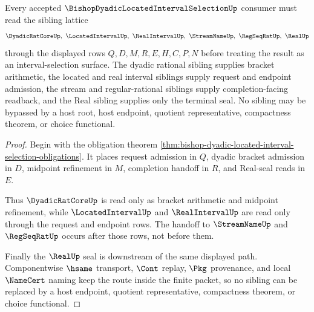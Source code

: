 \begin{theorem}
\label{thm:bishop-dyadic-located-interval-selection-sibling-lattice}
Every accepted $\BishopDyadicLocatedIntervalSelectionUp$ consumer must read the sibling lattice
$$
\DyadicRatCoreUp,\ \LocatedIntervalUp,\ \RealIntervalUp,\ \StreamNameUp,\ \RegSeqRatUp,\ \RealUp
$$
through the displayed rows $Q,D,M,R,E,H,C,P,N$ before treating the result as an interval-selection surface. The dyadic rational sibling supplies bracket arithmetic, the located and real interval siblings supply request and endpoint admission, the stream and regular-rational siblings supply completion-facing readback, and the Real sibling supplies only the terminal seal. No sibling may be bypassed by a host root, host endpoint, quotient representative, compactness theorem, or choice functional.
\end{theorem}
\begin{proof}
Begin with the obligation theorem \autoref{thm:bishop-dyadic-located-interval-selection-obligations}. It places request admission in $Q$, dyadic bracket admission in $D$, midpoint refinement in $M$, completion handoff in $R$, and Real-seal reads in $E$.

Thus $\DyadicRatCoreUp$ is read only as bracket arithmetic and midpoint refinement, while $\LocatedIntervalUp$ and $\RealIntervalUp$ are read only through the request and endpoint rows. The handoff to $\StreamNameUp$ and $\RegSeqRatUp$ occurs after those rows, not before them.

Finally the $\RealUp$ seal is downstream of the same displayed path. Componentwise $\hsame$ transport, $\Cont$ replay, $\Pkg$ provenance, and local $\NameCert$ naming keep the route inside the finite packet, so no sibling can be replaced by a host endpoint, quotient representative, compactness theorem, or choice functional.
\end{proof}


